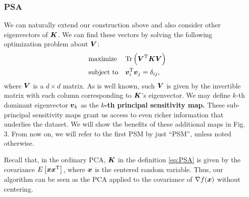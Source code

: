 \subsubsection{PSA}
%
We can naturally extend our construction above and also consider other
eigenvectors of $\mbox{\boldmath $K$}$.
%
We can find these vectors by solving the following optimization
problem about $\mbox{\boldmath $V$}$:
\begin{align}
\begin{split}
\begin{aligned}
& \text{maximize}
& & \mathrm{Tr}\left(\mbox{\boldmath $V$}^{\mathrm{T}} \mbox{\boldmath $K$} \mbox{\boldmath $V$}\right) \\
& \text{subject to}
& & \mbox{\boldmath $v$}_i^{\mathrm{T}}\mbox{\boldmath $v$}_j = \delta_{ij},
\end{aligned}
\end{split} \label{eq:PSA}
\end{align}
%
where $\mbox{\boldmath $V$}$ is a $d \times d$ matrix. As is well known, such $\mbox{\boldmath $V$}$ is given by
the invertible matrix with each column corresponding to $\mbox{\boldmath $K$}$'s
eigenvector.
%
We may define $k$-th dominant eigenvector $\mbox{\boldmath $v$}_{k}$ as
the \textbf{$k$-th principal sensitivity map.} These sub-principal sensitivity maps grant us
access to even richer information that underlies the dataset.
%
We will show the benefits of these additional maps in Fig.\,3.
From now on, we will refer to the first PSM by just ``PSM'', unless noted otherwise.

Recall that, in the ordinary PCA,  $\mbox{\boldmath $K$}$ in the definition \eqref{eq:PSA} is given by the covariance
$E\left[ \mbox{\boldmath $x$} \mbox{\boldmath $x$}^{\mathrm{T}} \right]$, where $\mbox{\boldmath $x$}$ is the
centered random variable.
%
Thus, our algorithm can be seen as the PCA
applied to the covariance of $\nabla f(\mbox{\boldmath $x$})$ without centering.

